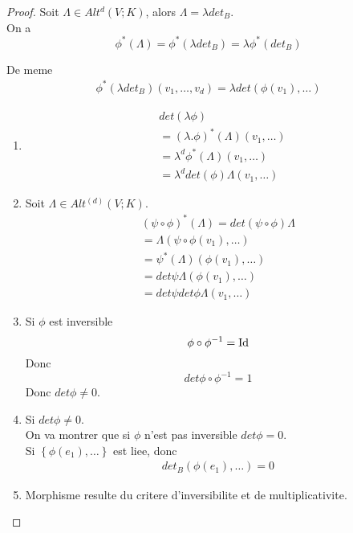 \documentclass[../main.tex]{subfiles}
\begin{document}
\begin{proof}
	Soit $\Lambda \in Alt^{d}( V;K) $, alors $\Lambda = \lambda det_B$.\\
	On a 
	\[ 
		\phi^{*}(\Lambda ) = \phi^{*}( \lambda det_B) = \lambda \phi^{*}( det_B) 
	\]
	
De meme
\begin{align*}
	\phi^{*}( \lambda det_B) ( v_1, \ldots, v_d ) = \lambda det( \phi( v_1) , \ldots) 
\end{align*}
\begin{enumerate}
\item 
	\begin{align*}
		&det( \lambda \phi) \\
		&= ( \lambda. \phi) ^{*}( \Lambda) ( v_1, \ldots) \\
		&= \lambda^{d} \phi^{*}( \Lambda) ( v_1, \ldots)\\
		&= \lambda^{d}det( \phi) \Lambda( v_1, \ldots) 
	\end{align*}

\item Soit $\Lambda \in Alt^{( d) }( V;K) $.
	\begin{align*}
		( \psi \circ \phi) ^{*}( \Lambda) = det( \psi \circ \phi) \Lambda\\
		= \Lambda( \psi\circ \phi(v_1 ) ,\ldots) \\
		= \psi^{*}( \Lambda) ( \phi( v_1) ,\ldots) \\
		= det \psi \Lambda( \phi( v_1) , \ldots) \\
		= det \psi det \phi \Lambda( v_1, \ldots) 
	\end{align*}
	
\item Si $\phi$ est inversible
	\[ 
	\phi \circ \phi^{-1}= \operatorname*{Id}
	\]
	Donc
	\[ 
	det \phi \circ \phi^{-1} = 1 
	\]
	Donc $det \phi \neq 0$.

\item Si $det \phi \neq 0$.\\
	On va montrer que si $\phi$ n'est pas inversible $det \phi = 0 $.\\
	Si  $ \left\{ \phi( e_1) , \ldots \right\} $ est liee, donc 
	\begin{align*}
		det_B ( \phi( e_1) , \ldots) = 0
	\end{align*}
	
\item Morphisme resulte du critere d'inversibilite et de multiplicativite.
	
\end{enumerate}

\end{proof}




	
\end{document}
